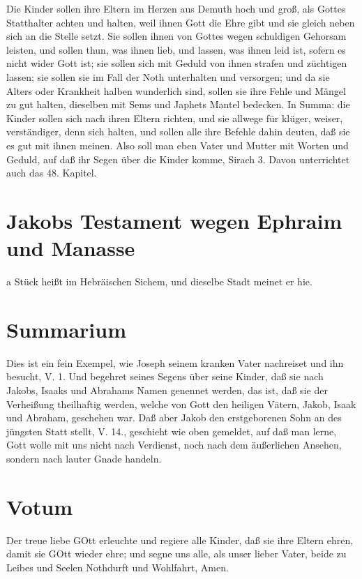 Die Kinder sollen ihre Eltern im Herzen aus Demuth hoch und groß, als Gottes Statthalter achten und halten, weil ihnen Gott die Ehre gibt und sie gleich neben sich an die Stelle setzt. Sie sollen ihnen von Gottes wegen schuldigen Gehorsam leisten, und sollen thun, was ihnen lieb, und lassen, was ihnen leid ist, sofern es nicht wider Gott ist; sie sollen sich mit Geduld von ihnen strafen und züchtigen lassen; sie sollen sie im Fall der Noth unterhalten und versorgen; und da sie Alters oder Krankheit halben wunderlich sind, sollen sie ihre Fehle und Mängel zu gut halten, dieselben mit Sems und Japhets Mantel bedecken. In Summa: die Kinder sollen sich nach ihren Eltern richten, und sie allwege für klüger, weiser, verständiger, denn sich halten, und sollen alle
ihre Befehle dahin deuten, daß sie es gut mit ihnen meinen. Also soll man eben Vater und Mutter mit Worten und Geduld, auf daß ihr Segen über die Kinder komme, Sirach 3. Davon unterrichtet auch das 48. Kapitel.

\section{Jakobs Testament wegen Ephraim und Manasse}

a Stück heißt im Hebräischen Sichem, und dieselbe Stadt meinet er hie.

\section{Summarium}

Dies ist ein fein Exempel, wie Joseph seinem kranken Vater nachreiset und ihn besucht, V. 1. Und begehret seines Segens über seine Kinder, daß sie nach Jakobs, Isaaks und Abrahams Namen genennet werden, das ist, daß sie der Verheißung theilhaftig werden, welche von Gott
den heiligen Vätern, Jakob, Isaak und Abraham, geschehen war. Daß aber Jakob den erstgeborenen Sohn an des jüngsten Statt stellt, V. 14., geschieht wie oben gemeldet, auf daß man lerne, Gott wolle mit uns nicht nach Verdienst, noch nach dem äußerlichen Ansehen, sondern nach lauter Gnade handeln.

\section{Votum}

Der treue liebe GOtt erleuchte und regiere alle Kinder, daß sie ihre Eltern ehren, damit sie GOtt wieder ehre; und segne uns alle, als unser lieber Vater, beide zu Leibes und Seelen Nothdurft und Wohlfahrt, Amen.

